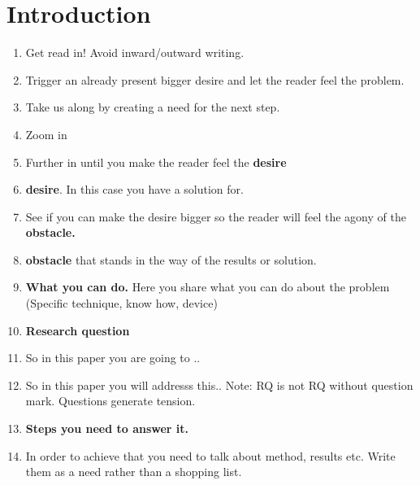 \section{Introduction}

\begin{enumerate}
    \item Get read in! Avoid inward/outward writing.
    \item Trigger an already present bigger desire and let the reader feel the problem.
    \item Take us along by creating a need for the next step.
    \item Zoom in
    \item Further in until you make the reader feel the \textbf{desire}
    \item \textbf{desire}. In this case you have a solution for.
    \item See if you can make the desire bigger so the reader will feel the agony of the
          \textbf{obstacle.}
    \item \textbf{obstacle} that stands in the way of the results or solution.
    \item \textbf{What you can do.} Here you share what you can do about the problem (Specific
          technique, know how, device)
    \item \textbf{Research question}
    \item So in this paper you are going to ..
    \item So in this paper you will addresss this.. Note: RQ is not RQ without question mark.
          Questions generate tension.
    \item \textbf{Steps you need to answer it.}
    \item In order to achieve that you need to talk about method, results etc. Write them as a need
          rather than a shopping list.
\end{enumerate}